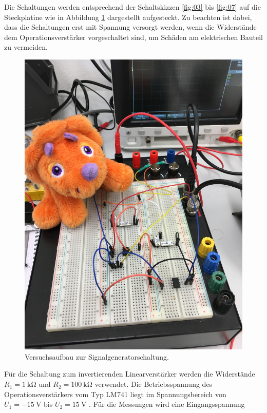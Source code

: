 \noindent Die Schaltungen werden entsprechend der Schaltskizzen \ref{fig:03} bis
\ref{fig:07} auf die Steckplatine wie in Abbildung \ref{aufbau} dargestellt
aufgesteckt. Zu beachten ist dabei, dass die Schaltungen erst mit Spannung
versorgt werden, wenn die Widerstände dem Operationsverstärker vorgeschaltet
sind, um Schäden am elektrischen Bauteil zu vermeiden. \\
\FloatBarrier
\begin{figure}
  \centering
  \includegraphics[scale=0.07]{ressources/aufbau.JPG}
  \caption{Versuchsaufbau zur Signalgeneratorschaltung.}
  \label{aufbau}
\end{figure}
\FloatBarrier
\noindent Für die Schaltung zum invertierenden Linearverstärker werden die
Widerstände $R_1 = \SI{1}{\kilo\ohm}$ und $R_2 = \SI{100}{\kilo\ohm}$
verwendet. Die Betriebsspannung des Operationsverstärkers vom Typ LM741
liegt im Spannungsbereich von $U_1 = -\SI{15}{\volt}$ bis $U_2 = \SI{15}{\volt}$
\cite{datenblatt}. Für die Messungen wird eine Eingangsspannung
